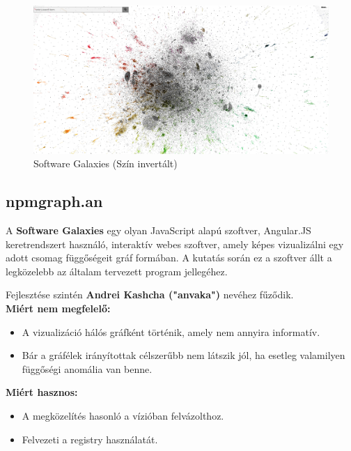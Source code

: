 	\begin{figure}[!h]
		\centering
		\includegraphics[scale=0.15]{images/anvaka_pm.png}
		\caption{Software Galaxies (Szín invertált)}
		\label{fig:sw-galaxies}
	\end{figure}
	
	\subsection{npmgraph.an}
	
	A \textbf{Software Galaxies} egy olyan JavaScript alapú szoftver, Angular.JS keretrendszert használó, interaktív webes szoftver, amely képes vizualizálni egy adott csomag függőségeit gráf formában. A kutatás során ez a szoftver állt a legközelebb az általam tervezett program jellegéhez.
	
	Fejlesztése szintén \textbf{Andrei Kashcha ("anvaka")} nevéhez fűződik.
	\\
	
	\textbf{Miért nem megfelelő:}
	\begin{itemize}
		\item A vizualizáció hálós gráfként történik, amely nem annyira informatív.
		\item Bár a gráfélek irányítottak célszerűbb nem látszik jól, ha esetleg valamilyen függőségi anomália van benne.
	\end{itemize}
	
	\textbf{Miért hasznos:}
	\begin{itemize}
		\item A megközelítés hasonló a vízióban felvázolthoz.
		\item Felvezeti a registry használatát.
	\end{itemize}
	
	\begin{flushright}
		\cite{anvaka-npmgraph}
	\end{flushright}
	
